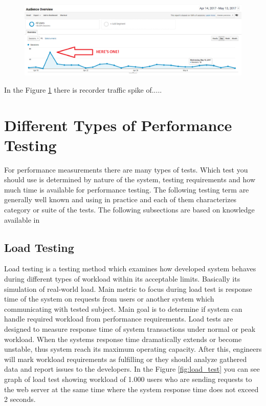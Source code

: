 \begin{figure}[H]
  \centering
  \includegraphics[width=15cm]{obrazky-figures/spike.png}
  \caption{}
  \label{fig:spikes}
\end{figure}

In the Figure \ref{fig:spikes} there is recorder traffic spike of.....

\section{Different Types of Performance Testing}
\label{Different Types of Performance Testing}

For performance measurements there are many types of tests. Which test you should use is determined by nature of the system, testing requirements and how much time is available for performance testing. The following testing term are generally well known and using in practice and each of them characterizes category or suite of the tests. The following subsections are based on knowledge available in \cite{TuPo:TESTS}

\subsection*{Load Testing}
Load testing is a testing method which examines how developed system behaves during different types of workload within its acceptable limits. Basically its simulation of real-world load. Main metric to focus during load test is response time of the system on requests from users or another system which communicating with tested subject. Main goal is to determine if system can handle required workload from performance requirements. Load tests are designed to measure response time of system transactions under normal or peak workload. When the systems response time dramatically extends or become unstable, thus system reach its maximum operating capacity. After this, engineers will mark workload requirements as fulfilling or they should analyze gathered data and report issues to the developers. In the Figure \ref{fig:load_test} you can see graph of load test showing workload of 1.000 users who are sending requests to the web server at the same time where the system response time does not exceed 2 seconds.

